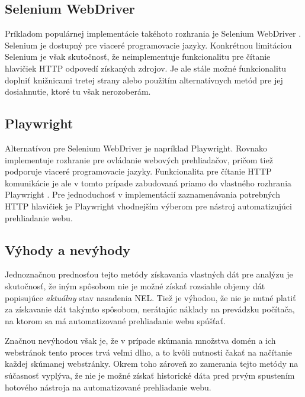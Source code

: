 \subsection{Selenium WebDriver}

Príkladom populárnej implementácie takéhoto rozhrania je Selenium WebDriver \cite{crawling-selenium}.
Selenium je dostupný pre viaceré programovacie jazyky.
Konkrétnou limitáciou Selenium je však skutočnosť, že neimplementuje funkcionalitu pre čítanie hlavičiek HTTP odpovedí získaných zdrojov.
Je ale stále možné funkcionalitu doplniť knižnicami tretej strany alebo použitím alternatívnych metód pre jej dosiahnutie, ktoré tu však nerozoberám.

\subsection{Playwright}

Alternatívou pre Selenium WebDriver je napríklad Playwright.
Rovnako implementuje rozhranie pre ovládanie webových prehliadačov,
pričom tiež podporuje viaceré programovacie jazyky.
Funkcionalita pre čítanie HTTP komunikácie je ale v tomto prípade zabudovaná priamo do vlastného rozhrania Playwright \cite{crawling-playwright}.
Pre jednoduchosť v implementácií zaznamenávania potrebných HTTP hlavičiek je Playwright vhodnejším výberom pre nástroj automatizujúci prehliadanie webu.

\subsection{Výhody a nevýhody}

Jednoznačnou prednosťou tejto metódy získavania vlastných dát pre analýzu je skutočnosť, že iným spôsobom nie je možné získať rozsiahle objemy dát popisujúce \textit{aktuálny} stav nasadenia NEL.
Tiež je výhodou, že nie je nutné platiť za získavanie dát takýmto spôsobom, nerátajúc náklady na prevádzku počítača, na ktorom sa má automatizované prehliadanie webu spúšťať.

Značnou nevýhodou však je, že v prípade skúmania množstva domén a ich webstránok tento proces trvá veľmi dlho, a to kvôli nutnosti čakať na načítanie každej skúmanej webstránky. 
Okrem toho zároveň zo zamerania tejto metódy na súčasnosť vyplýva, že nie je možné získať historické dáta pred prvým spustením hotového nástroja na automatizované prehliadanie webu.  


